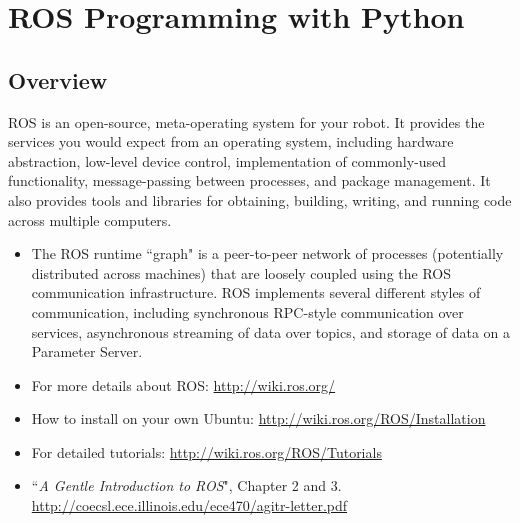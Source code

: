 \chapter{ROS Programming with Python}
\label{cprog}


\section{Overview}
ROS is an open-source, meta-operating system for your robot. It provides the services you would expect from an operating system, including
hardware abstraction, low-level device control, implementation of commonly-used functionality, message-passing between processes, and package
management. It also provides tools and libraries for obtaining, building, writing, and running code across multiple computers. \\

\begin{itemize}
\item The ROS runtime ``graph" is a peer-to-peer network of processes (potentially distributed across machines) that are loosely coupled
using the ROS communication infrastructure. ROS implements several different styles of communication, including synchronous RPC-style
communication over services, asynchronous streaming of data over topics, and storage of data on a Parameter Server. \\

\item For more details about ROS: \url{http://wiki.ros.org/}
\item How to install on your own Ubuntu: \url{http://wiki.ros.org/ROS/Installation}
\item For detailed tutorials: \url{http://wiki.ros.org/ROS/Tutorials}
\item ``\textit{A Gentle Introduction to ROS}", Chapter 2 and 3. \url{http://coecsl.ece.illinois.edu/ece470/agitr-letter.pdf}
\end{itemize}

